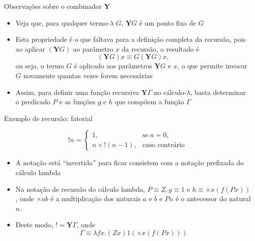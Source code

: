\begin{frame}[fragile]{Observações sobre o combinador $\mathbf{Y}$}

    \begin{itemize}
        \item Veja que, para qualquer termo-$\lambda$ $G$, $\mathbf{Y}G$ é um ponto fixo de $G$

        \item Esta propriedade é o que faltava para a definição completa da recursão, pois
            ao aplicar $(\mathbf{Y}G)$ ao parâmetro $x$ da recursão, o resultado é 
        \[
            (\mathbf{Y}G)x \equiv G(\mathbf{Y}G)x,
        \]
        ou seja, o termo $G$ é aplicado aos parâmetros $\mathbf{Y}G$ e $x$, o que permite invocar
        $G$ novamente quantas vezes forem necessárias

        \item Assim, para definir uma função recursiva $\mathbf{Y}\Gamma$ no cálculo-$\lambda$, basta 
        determinar o predicado $P$ e as funções $g$ e $h$ que compõem a função $\Gamma$
    \end{itemize}

\end{frame}

\begin{frame}[fragile]{Exemplo de recursão: fatorial}

    \begin{huge}
    \[
        !n =  \left\lbrace \begin{array}{ll}
                    1, & \mbox{se}\ n = 0, \\
                    n \times !(n - 1), & \mbox{caso contrário}
                \end{array} \right.
    \]
    \end{huge}

    \begin{itemize}
        \item A notação está ``invertida'' para ficar consistem com a notação prefixada
            do cálculo lambda

        \item Na notação de recursão do cálculo lambda, $P\equiv Z, g \equiv 1$ e 
            $h\equiv \times x(f(Px))$, onde $\times ab$ é a multiplicação dos 
            naturais $a$ e $b$ e $Pn$ é o antecessor do natural $n$. 

        \item Deste modo, $! = \mathbf{Y} \Gamma$, onde
        \[
            \Gamma\equiv \lambda fx.(Zx)1(\times x(f(Px)))
        \]
    \end{itemize}
\end{frame}

